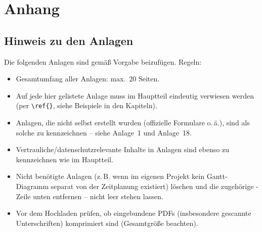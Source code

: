 \chapter*{Anhang}

\section*{Hinweis zu den Anlagen}
Die folgenden Anlagen sind gem\"a\ss{} Vorgabe beizuf\"ugen. Regeln:
\begin{itemize}
  \item Gesamtumfang aller Anlagen: max.\ 20 Seiten.
  \item Auf jede hier gelistete Anlage muss im Hauptteil eindeutig verwiesen
    werden (per \verb|\ref{}|, siehe Beispiele in den Kapiteln).
  \item Anlagen, die nicht selbst erstellt wurden (offizielle Formulare
    o.\,\"a.), sind als solche zu kennzeichnen -- siehe Anlage~1 und Anlage~18.
  \item Vertrauliche/datenschutzrelevante Inhalte in Anlagen sind ebenso zu
    kennzeichnen wie im Hauptteil.
  \item Nicht ben\"otigte Anlagen (z.\,B. wenn im eigenen Projekt kein
    Gantt-Diagramm separat von der Zeitplanung existiert) l\"oschen und die
    zugeh\"orige \verb||-Zeile unten entfernen -- nicht leer stehen
    lassen.
  \item Vor dem Hochladen pr\"ufen, ob eingebundene PDFs (insbesondere
    gescannte Unterschriften) komprimiert sind (Gesamtgr\"o\ss{}e beachten).
\end{itemize}



















